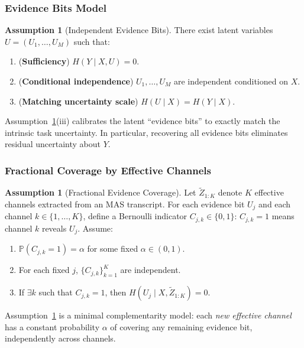 \documentclass{article}
\theoremstyle{plain}
\theoremstyle{definition}
\newtheorem{assumption}[theorem]{Assumption}
\theoremstyle{remark}
\begin{document}
\subsubsection{Evidence Bits Model}
\label{app:evidence-bits}

\begin{assumption}[Independent Evidence Bits]
\label{assump:evidence-bits}
There exist latent variables $U=(U_1,\ldots,U_M)$ such that:
\begin{enumerate}[leftmargin=1.2em]
\item (\textbf{Sufficiency}) $H(Y\mid X,U)=0$.
\item (\textbf{Conditional independence}) $U_1,\ldots,U_M$ are independent conditioned on $X$.
\item (\textbf{Matching uncertainty scale}) $H(U\mid X)=H(Y\mid X)$.
\end{enumerate}
\end{assumption}

Assumption~\ref{assump:evidence-bits}(iii) calibrates the latent ``evidence bits'' to exactly match the
intrinsic task uncertainty. In particular, recovering all evidence bits eliminates residual uncertainty about $Y$.

\subsubsection{Fractional Coverage by Effective Channels}
\label{app:coverage}

\begin{assumption}[Fractional Evidence Coverage]
\label{assump:coverage}
Let $\tilde Z_{1:K}$ denote $K$ effective channels extracted from an MAS transcript.
For each evidence bit $U_j$ and each channel $k\in\{1,\ldots,K\}$, define a Bernoulli indicator $C_{j,k}\in\{0,1\}$:
$C_{j,k}=1$ means channel $k$ reveals $U_j$.
Assume:
\begin{enumerate}[leftmargin=1.2em]
\item $\mathbb{P}(C_{j,k}=1)=\alpha$ for some fixed $\alpha\in(0,1)$.
\item For each fixed $j$, $\{C_{j,k}\}_{k=1}^K$ are independent.
\item If $\exists k$ such that $C_{j,k}=1$, then $H(U_j\mid X,\tilde Z_{1:K})=0$.
\end{enumerate}
\end{assumption}

Assumption~\ref{assump:coverage} is a minimal complementarity model: each \emph{new effective channel} has a constant
probability $\alpha$ of covering any remaining evidence bit, independently across channels.
\end{document}
